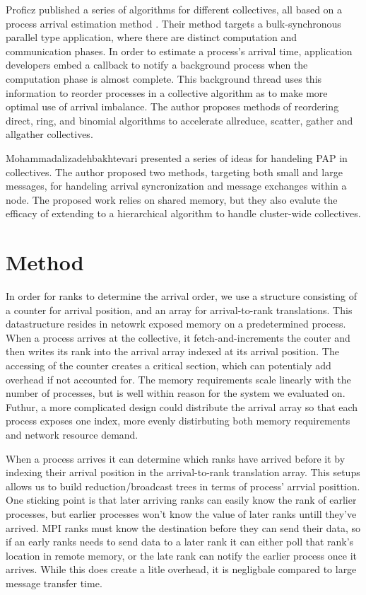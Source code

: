 Proficz published a series of algorithms for different collectives, all based on a process arrival estimation method \cite{Proficz2018ImprvAllReduceForImbPAP, Proficz2020PAPAwareScatterGather, Proficz2021AllGatherResilientToImbPAP}.
Their method targets a bulk-synchronous parallel type application, where there are distinct computation and communication phases.
In order to estimate a process's arrival time, application developers embed a callback to notify a background process when the computation phase is almost complete.
This background thread uses this information to reorder processes in a collective algorithm as to make more optimal use of arrival imbalance.
The author proposes methods of reordering direct, ring, and binomial algorithms to accelerate allreduce, scatter, gather and allgather collectives.

Mohammadalizadehbakhtevari \cite{Mohammadalizadehbakhtevari2021Thesis} presented a series of ideas for handeling PAP in collectives. 
The author proposed two methods, targeting both small and large messages, for handeling arrival syncronization and message exchanges within a node.
The proposed work relies on shared memory, but they also evalute the efficacy of extending to a hierarchical algorithm to handle cluster-wide collectives.

\section{Method}
In order for ranks to determine the arrival order, we use a structure consisting of a counter for arrival position, and an array for arrival-to-rank translations.
This datastructure resides in netowrk exposed memory on a predetermined process.
When a process arrives at the collective, it fetch-and-increments the couter and then writes its rank into the arrival array indexed at its arrival position.
The accessing of the counter creates a critical section, which can potentialy add overhead if not accounted for.
The memory requirements scale linearly with the number of processes, but is well within reason for the system we evaluated on.
Futhur, a more complicated design could distribute the arrival array so that each process exposes one index, more evenly distirbuting both memory requirements and network resource demand.

When a process arrives it can determine which ranks have arrived before it by indexing their arrival position in the arrival-to-rank translation array.
This setups allows us to build reduction/broadcast trees in terms of process' arrvial posittion.
One sticking point is that later arriving ranks can easily know the rank of earlier processes, but earlier processes won't know the value of later ranks untill they've arrived.
MPI ranks must know the destination before they can send their data, so if an early ranks needs to send data to a later rank it can either poll that rank's location in remote memory, or the late rank can notify the earlier process once it arrives.
While this does create a litle overhead, it is negligbale compared to large message transfer time.

